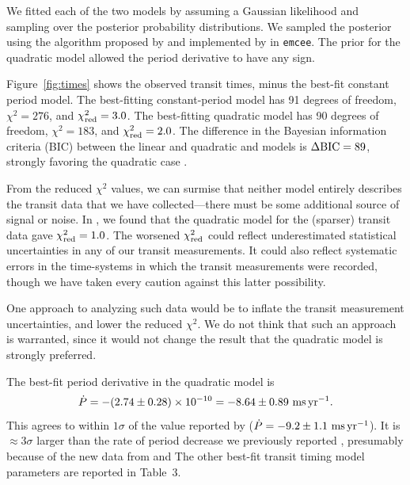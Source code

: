 \documentclass[12pt,twocolumn,tighten]{aastex62}
\begin{document}
We fitted each of the two models by assuming a Gaussian likelihood and
sampling over the posterior probability distributions.  We sampled the
posterior using the algorithm proposed by
\citet{goodman_ensemble_2010} and implemented by
\citet{foreman-mackey_emcee_2013} in \texttt{emcee}.  The prior for
the quadratic model allowed the period derivative to have any sign.

Figure~\ref{fig:times} shows the observed transit times, minus the
best-fit constant period model.  The best-fitting constant-period
model has 91 degrees of freedom, $\chi^2 = 276$,  and $\chi^2_{\rm
red}=3.0$.  The best-fitting quadratic model has 90 degrees of freedom,
$\chi^2 = 183$, and $\chi^2_{\rm red}=2.0$.  The difference in the
Bayesian information criteria (BIC) between the linear and quadratic
and models is $\Delta {\rm BIC} = 89$, strongly favoring the
quadratic case \citep{kass_bayes_1995}.

From the reduced $\chi^2$ values, we can surmise that neither model
entirely describes the transit data that we have collected---there
must be some additional source of signal or noise. In
, we found that the quadratic model for the
(sparser) transit data gave $\chi^2_{\rm red}=1.0$.  The worsened
$\chi^2_{\rm red}$ could reflect underestimated statistical
uncertainties in any of our transit measurements.  It could also
reflect systematic errors in the time-systems in which the transit
measurements were recorded, though we have taken every caution against
this latter possibility.

One approach to analyzing such data would be to inflate the transit
measurement uncertainties, and lower the reduced $\chi^2$.  We do not
think that such an approach is warranted, since it would not change
the result that the quadratic model is strongly preferred.

The best-fit period derivative in the quadratic model is
\begin{equation}
\dot{P}
  = - (2.74 \pm 0.28)\times 10^{-10}
  = - 8.64 \pm 0.89~{\rm ms}\,{\rm yr}^{-1}.
  \label{eq:dP_dt_obs}
\end{equation}
This agrees to within $1\sigma$ of the value reported by
\citet{southworth_transit_2019} ($\dot{P} = - 9.2 \pm 1.1~{\rm
ms}\,{\rm yr}^{-1}$).  It is $\approx$3$\sigma$ larger than the rate
of period decrease we previously reported , presumably because of the
new data from \citeauthor{southworth_transit_2019} and
\citeauthor{baluev_2019}  The other best-fit transit timing model
parameters are reported in Table~3.
\end{document}

